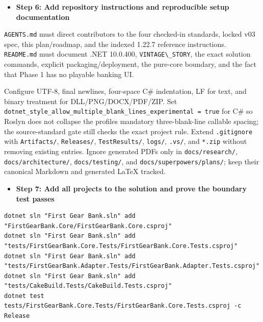 \documentclass[
  10pt,
  letterpaper,
]{article}
\newcommand{\passthrough}[1]{#1}
\providecommand{\tightlist}{%
  \setlength{\itemsep}{0pt}\setlength{\parskip}{0pt}}
\begin{document}
\begin{itemize}
\tightlist
\item[$\square$]
  \textbf{Step 6: Add repository instructions and reproducible setup
  documentation}
\end{itemize}

\passthrough{\lstinline!AGENTS.md!} must direct contributors to the four
checked-in standards, locked v03 spec, this plan/roadmap, and the
indexed 1.22.7 reference instructions.
\passthrough{\lstinline!README.md!} must document .NET 10.0.400,
\passthrough{\lstinline!VINTAGE\_STORY!}, the exact solution commands,
explicit packaging/deployment, the pure-core boundary, and the fact that
Phase 1 has no playable banking UI.

Configure UTF-8, final newlines, four-space C\# indentation, LF for
text, and binary treatment for
DLL/\allowbreak{}PNG/\allowbreak{}DOCX/\allowbreak{}PDF/\allowbreak{}ZIP.
Set
\texttt{dotnet\_}\allowbreak{}\texttt{style\_}\allowbreak{}\texttt{allow\_}\allowbreak{}\texttt{multiple\_}\allowbreak{}\texttt{blank\_}\allowbreak{}\texttt{lines\_}\allowbreak{}\texttt{experimental\ }\allowbreak{}\texttt{=}\allowbreak{}\texttt{\ }\allowbreak{}\texttt{true}
for C\# so Roslyn does not collapse the profile\textquotesingle s
mandatory three-blank-line callable spacing; the source-standard gate
still checks the exact project rule. Extend
\passthrough{\lstinline!.gitignore!} with
\texttt{Artifacts/}\allowbreak{}, \texttt{Releases/}\allowbreak{},
\texttt{TestResults/}\allowbreak{}, \texttt{logs/}\allowbreak{},
\texttt{.}\allowbreak{}\texttt{vs/}\allowbreak{}, and
\passthrough{\lstinline!*.zip!} without removing existing entries.
Ignore generated PDFs only in
\texttt{docs/}\allowbreak{}\texttt{research/}\allowbreak{},
\texttt{docs/}\allowbreak{}\texttt{architecture/}\allowbreak{},
\texttt{docs/}\allowbreak{}\texttt{testing/}\allowbreak{}, and
\texttt{docs/}\allowbreak{}\texttt{superpowers/}\allowbreak{}\texttt{plans/}\allowbreak{};
keep their canonical Markdown and generated LaTeX tracked.

\begin{itemize}
\tightlist
\item[$\square$]
  \textbf{Step 7: Add all projects to the solution and prove the
  boundary test passes}
\end{itemize}

\begin{lstlisting}
dotnet sln "First Gear Bank.sln" add "FirstGearBank.Core/FirstGearBank.Core.csproj"
dotnet sln "First Gear Bank.sln" add "tests/FirstGearBank.Core.Tests/FirstGearBank.Core.Tests.csproj"
dotnet sln "First Gear Bank.sln" add "tests/FirstGearBank.Adapter.Tests/FirstGearBank.Adapter.Tests.csproj"
dotnet sln "First Gear Bank.sln" add "tests/CakeBuild.Tests/CakeBuild.Tests.csproj"
dotnet test tests/FirstGearBank.Core.Tests/FirstGearBank.Core.Tests.csproj -c Release
\end{lstlisting}
\end{document}
